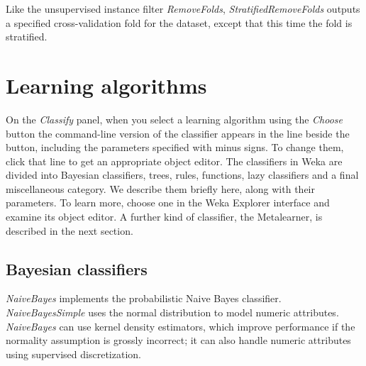 Like the unsupervised instance filter \textit{RemoveFolds},
\textit{StratifiedRemoveFolds} outputs a specified cross-validation
fold for the dataset, except that this time the fold is stratified.

\section{Learning algorithms}

On the \textit{Classify} panel, when you select a learning algorithm
using the \textit{Choose} button the command-line version of the
classifier appears in the line beside the button, including the
parameters specified with minus signs. To change them, click that line
to get an appropriate object editor. The classifiers in Weka are
divided into Bayesian classifiers, trees, rules, functions, lazy
classifiers and a final miscellaneous category. We describe them
briefly here, along with their parameters. To learn more, choose one
in the Weka Explorer interface and examine its object editor. A
further kind of classifier, the Metalearner, is described in the next
section.

\subsection{Bayesian classifiers}

\textit{NaiveBayes} implements the probabilistic Naive Bayes
classifier. \textit{NaiveBayesSimple} uses the normal distribution to
model numeric attributes. \textit{NaiveBayes} can use kernel density
estimators, which improve performance if the normality assumption is
grossly incorrect; it can also handle numeric attributes using
supervised discretization.

